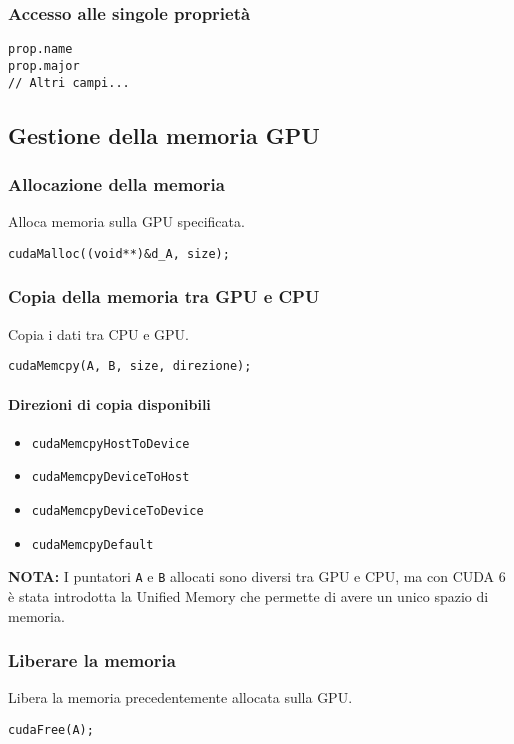 \documentclass{article}
\begin{document}
\subsubsection{Accesso alle singole proprietà}
\begin{verbatim}
prop.name
prop.major
// Altri campi...
\end{verbatim}

\subsection{Gestione della memoria GPU}

\subsubsection{Allocazione della memoria}
Alloca memoria sulla GPU specificata.
\begin{verbatim}
cudaMalloc((void**)&d_A, size);
\end{verbatim}

\subsubsection{Copia della memoria tra GPU e CPU}
Copia i dati tra CPU e GPU.
\begin{verbatim}
cudaMemcpy(A, B, size, direzione);
\end{verbatim}

\paragraph{Direzioni di copia disponibili}
\begin{itemize}
    \item \texttt{cudaMemcpyHostToDevice}
    \item \texttt{cudaMemcpyDeviceToHost}
    \item \texttt{cudaMemcpyDeviceToDevice}
    \item \texttt{cudaMemcpyDefault}
\end{itemize}
\textbf{NOTA:} I puntatori \texttt{A} e \texttt{B} allocati sono diversi tra GPU e CPU, ma con CUDA 6 è stata introdotta la Unified Memory che permette di avere un unico spazio di memoria.

\subsubsection{Liberare la memoria}
Libera la memoria precedentemente allocata sulla GPU.
\begin{verbatim}
cudaFree(A);
\end{verbatim}
\end{document}
